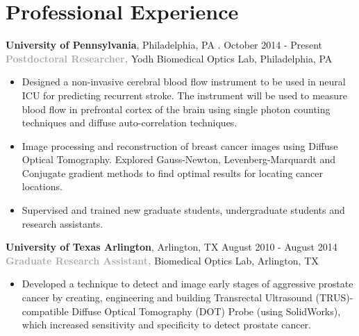 \documentclass{my_cv}
\begin{document}
\vspace{-7mm}%


\section{Professional Experience}
\begin{flushleft}  

\textbf{University of Pennsylvania}, Philadelphia, PA . \hfill October 2014 - Present \\ 
\textbf{\textcolor{darkgray}{Postdoctoral Researcher,} }Yodh Biomedical Optics Lab, Philadelphia, PA\\
\vspace{-2.3mm}
\begin{itemize} \itemsep 0mm %
\item Designed a non-invasive cerebral blood flow instrument to be used in neural ICU for predicting recurrent stroke. The instrument will be used to measure blood flow in prefrontal cortex of the brain using single photon counting techniques and diffuse auto-correlation techniques. 
\item Image processing and reconstruction of breast cancer images using Diffuse Optical Tomography. Explored Gauss-Newton, Levenberg-Marquardt and Conjugate gradient methods to find optimal results for locating cancer locations. 
\item Supervised and trained new graduate students, undergraduate students and research assistants.  
\end{itemize}

\textbf{University of Texas Arlington}, Arlington, TX \hfill August 2010 - August 2014 \\
\textbf{\textcolor{darkgray}{Graduate Research Assistant,} }Biomedical Optics Lab, Arlington, TX \\
\begin{itemize} \itemsep -2pt %
\vspace{-3mm}
\item Developed a technique to detect and image early stages of aggressive prostate cancer by creating, engineering and building Transrectal Ultrasound (TRUS)-compatible Diffuse Optical Tomography (DOT) Probe (using SolidWorks), which increased sensitivity and specificity to detect prostate cancer. 


\end{itemize}
\end{flushleft}
\end{document}
